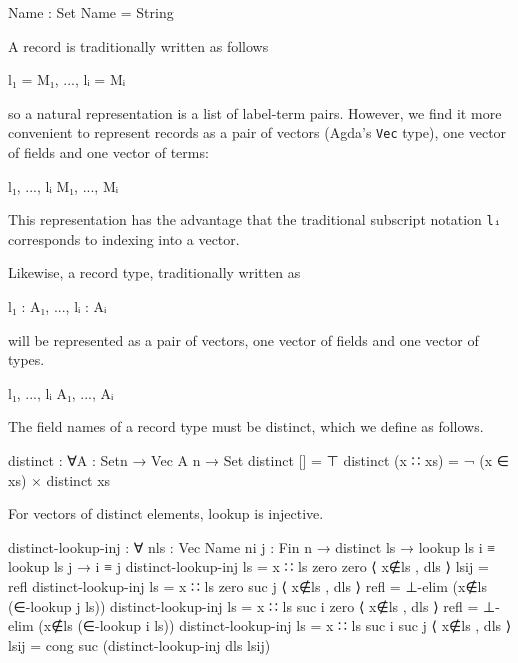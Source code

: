 \begin{fence}
\begin{code}
Name : Set
Name = String
\end{code}
\end{fence}

A record is traditionally written as follows

\begin{myDisplay}
{ l₁ = M₁, ..., lᵢ = Mᵢ }
\end{myDisplay}

so a natural representation is a list of label-term pairs. However, we
find it more convenient to represent records as a pair of vectors
(Agda's \texttt{Vec} type), one vector of fields and one vector of
terms:

\begin{myDisplay}
l₁, ..., lᵢ
M₁, ..., Mᵢ
\end{myDisplay}

This representation has the advantage that the traditional subscript
notation \texttt{lᵢ} corresponds to indexing into a vector.

Likewise, a record type, traditionally written as

\begin{myDisplay}
{ l₁ : A₁, ..., lᵢ : Aᵢ }
\end{myDisplay}

will be represented as a pair of vectors, one vector of fields and one
vector of types.

\begin{myDisplay}
l₁, ..., lᵢ
A₁, ..., Aᵢ
\end{myDisplay}

The field names of a record type must be distinct, which we define as
follows.

\begin{fence}
\begin{code}
distinct : ∀{A : Set}{n} → Vec A n → Set
distinct [] = ⊤
distinct (x ∷ xs) = ¬ (x ∈ xs) × distinct xs
\end{code}
\end{fence}

For vectors of distinct elements, lookup is injective.

\begin{fence}
\begin{code}
distinct-lookup-inj : ∀ {n}{ls : Vec Name n}{i j : Fin n}
   → distinct ls  →  lookup ls i ≡ lookup ls j
   → i ≡ j
distinct-lookup-inj {ls = x ∷ ls} {zero} {zero} ⟨ x∉ls , dls ⟩ lsij = refl
distinct-lookup-inj {ls = x ∷ ls} {zero} {suc j} ⟨ x∉ls , dls ⟩ refl =
    ⊥-elim (x∉ls (∈-lookup j ls))
distinct-lookup-inj {ls = x ∷ ls} {suc i} {zero} ⟨ x∉ls , dls ⟩ refl =
    ⊥-elim (x∉ls (∈-lookup i ls))
distinct-lookup-inj {ls = x ∷ ls} {suc i} {suc j} ⟨ x∉ls , dls ⟩ lsij =
    cong suc (distinct-lookup-inj dls lsij)
\end{code}
\end{fence}

